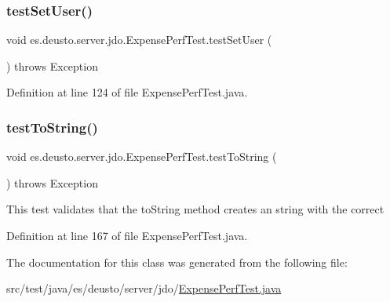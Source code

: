 \subsubsection{\texorpdfstring{test\+Set\+User()}{testSetUser()}}
{\footnotesize\ttfamily void es.\+deusto.\+server.\+jdo.\+Expense\+Perf\+Test.\+test\+Set\+User (\begin{DoxyParamCaption}{ }\end{DoxyParamCaption}) throws Exception}



Definition at line 124 of file Expense\+Perf\+Test.\+java.

\mbox{\label{classes_1_1deusto_1_1server_1_1jdo_1_1_expense_perf_test_aceacce2fc2defc16179d2aa2cde8f9df}} 
\subsubsection{\texorpdfstring{test\+To\+String()}{testToString()}}
{\footnotesize\ttfamily void es.\+deusto.\+server.\+jdo.\+Expense\+Perf\+Test.\+test\+To\+String (\begin{DoxyParamCaption}{ }\end{DoxyParamCaption}) throws Exception}

This test validates that the to\+String method creates an string with the correct 

Definition at line 167 of file Expense\+Perf\+Test.\+java.



The documentation for this class was generated from the following file\+:\begin{DoxyCompactItemize}
\item 
src/test/java/es/deusto/server/jdo/\hyperlink{_expense_perf_test_8java}{Expense\+Perf\+Test.\+java}\end{DoxyCompactItemize}
